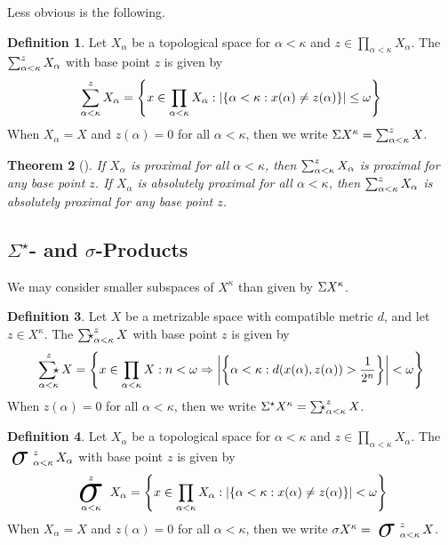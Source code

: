 \documentclass{amsart}
\newtheorem{theorem}{Theorem}[section]
\theoremstyle{definition}
\newtheorem{definition}[theorem]{Definition}
\begin{document}
  Less obvious is the following.

  \begin{definition}
    Let \(X_\alpha\) be a topological space for \(\alpha<\kappa\)
    and \(z\in\prod_{\alpha<\kappa}X_\alpha\).
    The  \(\sum_{\alpha<\kappa}^{z}X_\alpha\)
    with base point \(z\) is given by
    \[
      \sum_{\alpha<\kappa}^{z}X_\alpha
        =
      \left\{
        x\in \prod_{\alpha<\kappa}X_\alpha
      :
        |\{\alpha<\kappa:x(\alpha)\not=z(\alpha)\}|\leq\omega
      \right\}
    \]
    When \(X_\alpha=X\) and \(z(\alpha)=0\) for all \(\alpha<\kappa\),
    then we write \({\Sigma X^\kappa}=\sum_{\alpha<\kappa}^z X\).
  \end{definition}

  \begin{theorem}[\cite{MR3239205}]
    If \(X_\alpha\) is proximal for all \(\alpha<\kappa\),
    then \(\sum_{\alpha<\kappa}^{z}X_\alpha\) is proximal for any
    base point \(z\).
    If \(X_\alpha\) is absolutely proximal for all \(\alpha<\kappa\),
    then \(\sum_{\alpha<\kappa}^{z}X_\alpha\) is absolutely
    proximal for any base point \(z\).
  \end{theorem}

\subsection{\(\Sigma^\star\)- and \(\sigma\)-Products}

  We may consider smaller subspaces of
  \(X^\kappa\) than given by \({\Sigma X^\kappa}\).

  \begin{definition}
    Let \(X\) be a metrizable space with
    compatible metric \(d\), and let \(z\in X^\kappa\).
    The 
    \(\SigmaStarProd_{\alpha<\kappa}^{z}X\)
    with base point \(z\) is given by
    \[
      \SigmaStarProd_{\alpha<\kappa}^{z}X
        =
      \left\{
        x\in \prod_{\alpha<\kappa}X
      :
        n<\omega
      \Rightarrow
        \left|\left\{
          \alpha<\kappa:d(x(\alpha),z(\alpha))>\frac{1}{2^n}
        \right\}\right|
        <\omega
      \right\}
    \]
    When \(z(\alpha)=0\) for all \(\alpha<\kappa\),
    then we write
    \(\SigmaStarPower{X}{\kappa}=\SigmaStarProd_{\alpha<\kappa}^z X\).
  \end{definition}

  \begin{definition}
    Let \(X_\alpha\) be a topological space for \(\alpha<\kappa\)
    and \(z\in\prod_{\alpha<\kappa}X_\alpha\).
    The  \(\sigmaProd_{\alpha<\kappa}^{z}X_\alpha\)
    with base point \(z\) is given by
    \[
      \sigmaProd_{\alpha<\kappa}^{z}X_\alpha
        =
      \left\{
        x\in \prod_{\alpha<\kappa}X_\alpha
      :
        |\{\alpha<\kappa:x(\alpha)\not=z(\alpha)\}|<\omega
      \right\}
    \]
    When \(X_\alpha=X\) and \(z(\alpha)=0\) for all \(\alpha<\kappa\),
    then we write \(\sigmaPower{X}{\kappa}=\sigmaProd_{\alpha<\kappa}^z X\).
  \end{definition}
\end{document}
